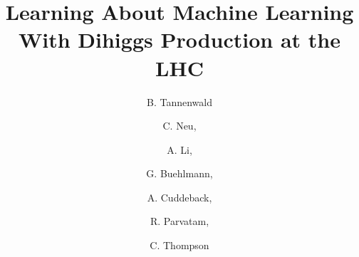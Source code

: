 \documentclass[a4paper,11pt]{article}
\title{\boldmath Learning About Machine Learning With Dihiggs Production at the LHC}
\author[a]{B. Tannenwald}
\author[a]{C. Neu,}
\author[a]{A. Li,}
\author[a]{G. Buehlmann,}
\author[a]{A. Cuddeback,}
\author[a]{R. Parvatam,}
\author[a]{C. Thompson}
\affiliation[a]{University of Virginia, 248 McCormick Road, Charlottesville, VA, USA}
\begin{document}
 
\maketitle
\flushbottom



%
%

















\end{document}
